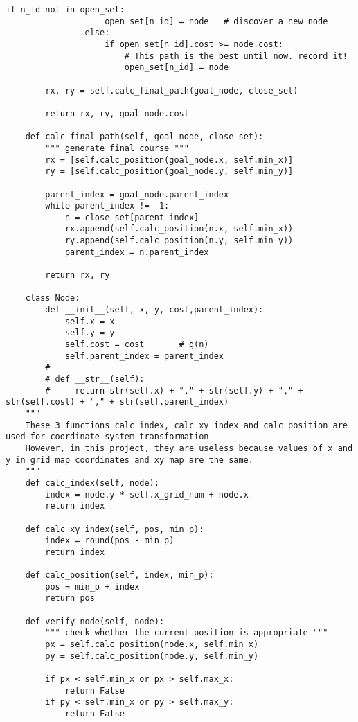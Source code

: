 \begin{lstlisting}[caption=Testing codes (\autoref{TestResults}), label=TestCodes]
                if n_id not in open_set:
                    open_set[n_id] = node   # discover a new node
                else:
                    if open_set[n_id].cost >= node.cost:
                        # This path is the best until now. record it!
                        open_set[n_id] = node

        rx, ry = self.calc_final_path(goal_node, close_set)

        return rx, ry, goal_node.cost

    def calc_final_path(self, goal_node, close_set):
        """ generate final course """
        rx = [self.calc_position(goal_node.x, self.min_x)]
        ry = [self.calc_position(goal_node.y, self.min_y)]
        
        parent_index = goal_node.parent_index
        while parent_index != -1:
            n = close_set[parent_index]
            rx.append(self.calc_position(n.x, self.min_x))
            ry.append(self.calc_position(n.y, self.min_y))
            parent_index = n.parent_index
            
        return rx, ry

    class Node:
        def __init__(self, x, y, cost,parent_index):
            self.x = x      
            self.y = y      
            self.cost = cost       # g(n)
            self.parent_index = parent_index    
        #
        # def __str__(self):
        #     return str(self.x) + "," + str(self.y) + "," + str(self.cost) + "," + str(self.parent_index)
    """ 
    These 3 functions calc_index, calc_xy_index and calc_position are used for coordinate system transformation
    However, in this project, they are useless because values of x and y in grid map coordinates and xy map are the same.
    """
    def calc_index(self, node):
        index = node.y * self.x_grid_num + node.x
        return index

    def calc_xy_index(self, pos, min_p):
        index = round(pos - min_p)
        return index

    def calc_position(self, index, min_p):
        pos = min_p + index
        return pos

    def verify_node(self, node):
        """ check whether the current position is appropriate """
        px = self.calc_position(node.x, self.min_x)
        py = self.calc_position(node.y, self.min_y)

        if px < self.min_x or px > self.max_x:
            return False
        if py < self.min_x or py > self.max_y:
            return False


\end{lstlisting}
